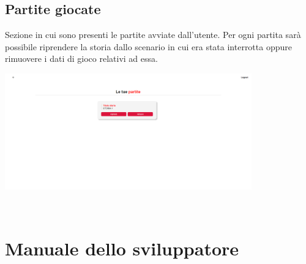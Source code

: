 \documentclass{article}
\begin{document}
\subsection*{Partite giocate}
Sezione in cui sono presenti le partite avviate dall'utente. Per ogni partita sarà possibile riprendere la storia dallo scenario in cui era stata interrotta oppure rimuovere i dati di gioco relativi ad essa.
\begin{center}
    \includegraphics[width=0.8\textwidth]{foto26.png}
\end{center}\vspace*{7pt}\\

\clearpage
\section*{Manuale dello sviluppatore}
\end{document}
